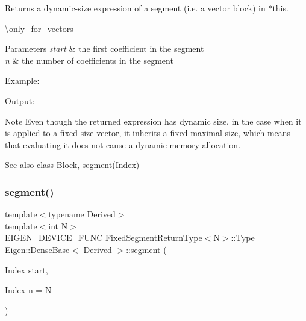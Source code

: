 \begin{DoxyReturn}{Returns}
a dynamic-\/size expression of a segment (i.\+e. a vector block) in $\ast$this.
\end{DoxyReturn}
\textbackslash{}only\+\_\+for\+\_\+vectors


\begin{DoxyParams}{Parameters}
{\em start} & the first coefficient in the segment \\
\hline
{\em n} & the number of coefficients in the segment\\
\hline
\end{DoxyParams}
Example\+: 
\begin{DoxyCodeInclude}{0}
\end{DoxyCodeInclude}
 Output\+: 
\begin{DoxyVerbInclude}
\end{DoxyVerbInclude}


\begin{DoxyNote}{Note}
Even though the returned expression has dynamic size, in the case when it is applied to a fixed-\/size vector, it inherits a fixed maximal size, which means that evaluating it does not cause a dynamic memory allocation.
\end{DoxyNote}
\begin{DoxySeeAlso}{See also}
class \mbox{\hyperlink{class_eigen_1_1_block}{Block}}, segment(\+Index) 
\end{DoxySeeAlso}
\mbox{\label{class_eigen_1_1_dense_base_a04ad846b3fa133e9047845ffe18ab58c}} 
\subsubsection{\texorpdfstring{segment()}{segment()}\hspace{0.1cm}{\footnotesize\ttfamily [2/2]}}
{\footnotesize\ttfamily template$<$typename Derived$>$ \\
template$<$int N$>$ \\
E\+I\+G\+E\+N\+\_\+\+D\+E\+V\+I\+C\+E\+\_\+\+F\+U\+NC \mbox{\hyperlink{struct_eigen_1_1_dense_base_1_1_fixed_segment_return_type}{Fixed\+Segment\+Return\+Type}}$<$N$>$\+::Type \mbox{\hyperlink{class_eigen_1_1_dense_base}{Eigen\+::\+Dense\+Base}}$<$ Derived $>$\+::segment (\begin{DoxyParamCaption}\item[{Index}]{start,  }\item[{Index}]{n = {\ttfamily N} }\end{DoxyParamCaption})\hspace{0.3cm}{\ttfamily [inline]}}

